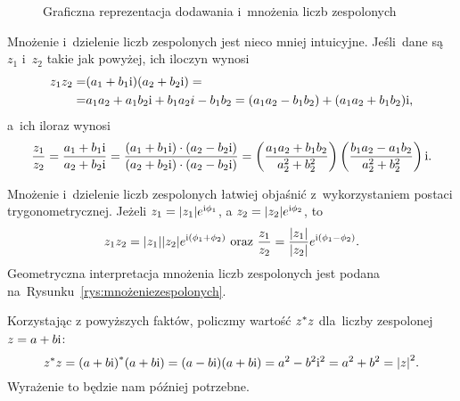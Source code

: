 \begin{figure}[b]
{{
		}
	}
	\caption{Graficzna reprezentacja dodawania i~mnożenia liczb zespolonych}
	\label{rys:dodawanieimnożeniezespolonych}
\end{figure}

Mnożenie i~dzielenie liczb zespolonych jest nieco mniej intuicyjne. Jeśli~dane
są $z_1$ i~$z_2$ takie jak powyżej, ich iloczyn wynosi
\begin{equation*}
	\begin{split}
		z_1 z_2 =&(a_1+b_1 {\mathrm i}) (a_2 + b_2 {\mathrm i})=
		\\=&a_1 a_2 + a_1 b_2 {\mathrm i} + b_1 a_2 i - b_1 b_2 = (a_1 a_2 - b_1 b_2) + (a_1 a_2 + b_1 b_2){\mathrm i},
	\end{split}
\end{equation*}
a~ich iloraz wynosi
$$ \frac{z_1}{z_2} =
	\frac{a_1 + b_1{\mathrm i}}{a_2 +b_2{\mathrm i}} =
	\frac{\left(a_1 + b_1{\mathrm i}\right) \cdot \left(a_2 - b_2{\mathrm i}\right)}
	{\left (a_2 + b_2{\mathrm i}\right) \cdot \left (a_2 - b_2{\mathrm i}\right)} =
	\left({a_1a_2 + b_1b_2 \over a_2^2 + b_2^2}\right) \left( {b_1a_2 - a_1b_2 \over a_2^2 + b_2^2} \right){\mathrm i}.
$$

Mnożenie i~dzielenie liczb zespolonych łatwiej objaśnić z~wykorzystaniem postaci
trygonometrycznej. Jeżeli
$z_1 = \abs{z_1}e^{{\mathrm i} \phi_1}$, a $z_2 = \abs{z_2}e^{{\mathrm i} \phi_2}$, to
$$
	z_1 z_2 = \abs{z_1} \abs{z_2} e^{{\mathrm i} (\phi_1+\phi_2)}
	\text{ oraz } \frac{z_1}{z_2} = \frac{\abs{z_1}}{\abs{z_2}} e^{{\mathrm i} (\phi_1 - \phi_2)}.
$$
Geometryczna interpretacja mnożenia
liczb zespolonych jest podana na~Rysunku~\ref{rys:mnożeniezespolonych}.

Korzystając z powyższych faktów, policzmy wartość ${z}^*z$
dla~liczby zespolonej $z=a+b{\mathrm i}$:
$${z}^*z = {(a+b{\mathrm i})}^*(a+b{\mathrm i}) =
	(a-b{\mathrm i})(a+b{\mathrm i}) = a^2 - b^2{\mathrm i}^2 = a^2+b^2 = \abs{z}^2.$$
Wyrażenie to będzie nam później potrzebne.

